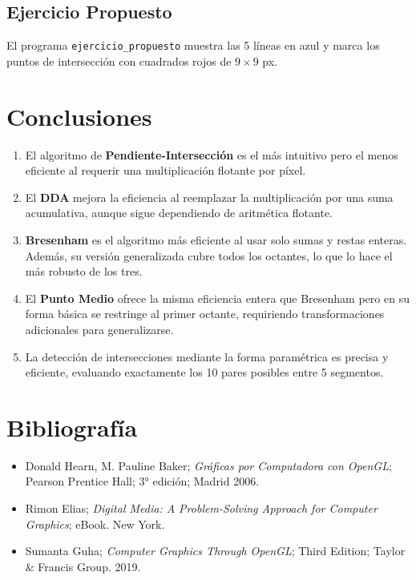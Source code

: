 \documentclass[12pt,a4paper]{article}
\begin{document}
\subsection{Ejercicio Propuesto}

El programa \texttt{ejercicio\_propuesto} muestra las 5 líneas en azul y marca
los puntos de intersección con cuadrados rojos de $9\times9$ px.

\section{Conclusiones}

\begin{enumerate}
  \item El algoritmo de \textbf{Pendiente-Intersección} es el más intuitivo pero
        el menos eficiente al requerir una multiplicación flotante por píxel.

  \item El \textbf{DDA} mejora la eficiencia al reemplazar la multiplicación por
        una suma acumulativa, aunque sigue dependiendo de aritmética flotante.

  \item \textbf{Bresenham} es el algoritmo más eficiente al usar solo sumas y
        restas enteras. Además, su versión generalizada cubre todos los octantes,
        lo que lo hace el más robusto de los tres.

  \item El \textbf{Punto Medio} ofrece la misma eficiencia entera que Bresenham
        pero en su forma básica se restringe al primer octante, requiriendo
        transformaciones adicionales para generalizarse.

  \item La detección de intersecciones mediante la forma paramétrica es precisa
        y eficiente, evaluando exactamente los 10 pares posibles entre 5 segmentos.
\end{enumerate}

\section*{Bibliografía}

\begin{itemize}
  \item Donald Hearn, M. Pauline Baker; \textit{Gráficas por Computadora con OpenGL};
        Pearson Prentice Hall; 3° edición; Madrid 2006.

  \item Rimon Elias; \textit{Digital Media: A Problem-Solving Approach for Computer
        Graphics}; eBook. New York.

  \item Sumanta Guha; \textit{Computer Graphics Through OpenGL}; Third Edition;
        Taylor \& Francis Group. 2019.
\end{itemize}
\end{document}
